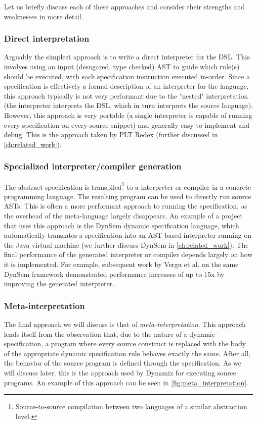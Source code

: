 Let us briefly discuss each of these approaches and consider their strengths and weaknesses in more detail. 

\subsubsection*{Direct interpretation} Arguably the simplest approach is to write a direct interpreter for the \ac{DSL}. This involves using an input (desugared, type checked) \ac{AST} to guide which rule(s) should be executed, with each specification instruction executed in-order. Since a specification is effectively a formal description of an interpreter for the language, this approach typically is not very performant due to the "nested" interpretation (the interpreter interprets the \ac{DSL}, which in turn interprets the source language). However, this approach is very portable (a single interpreter is capable of running every specification on every source snippet) and generally easy to implement and debug. This is the approach taken by PLT Redex \cite{MatthewsFFF04} (further discussed in \cref{ch:related_work}).

\subsubsection*{Specialized interpreter/compiler generation} The abstract specification is transpiled\footnote{Source-to-source compilation between two languages of a similar abstraction level.} to a interpreter or compiler in a concrete programming language. The resulting program can be used to directly run source ASTs. This is often a more performant approach to running the specification, as the overhead of the meta-language largely disappears. An example of a project that uses this approach is the DynSem \cite{VerguNV15} dynamic specification language, which automatically translates a specification into an AST-based interpreter running on the Java virtual machine (we further discuss DynSem in \cref{ch:related_work}). The final performance of the generated interpreter or compiler depends largely on how it is implemented. For example, subsequent work by Vergu et al. \cite{VerguV18} on the same DynSem framework demonstrated performance increases of up to 15x by improving the generated interpreter.

\subsubsection*{Meta-interpretation} The final approach we will discuss is that of \textit{meta-interpretation}. This approach lends itself from the observation that, due to the nature of a dynamic specification, a program where every source construct is replaced with the body of the appropriate dynamic specification rule behaves exactly the same. After all, the behavior of the source program is defined through the specification. As we will discuss later, this is the approach used by Dynamix for executing source programs. An example of this approach can be seen in \cref{fig:meta_interpretation}.

